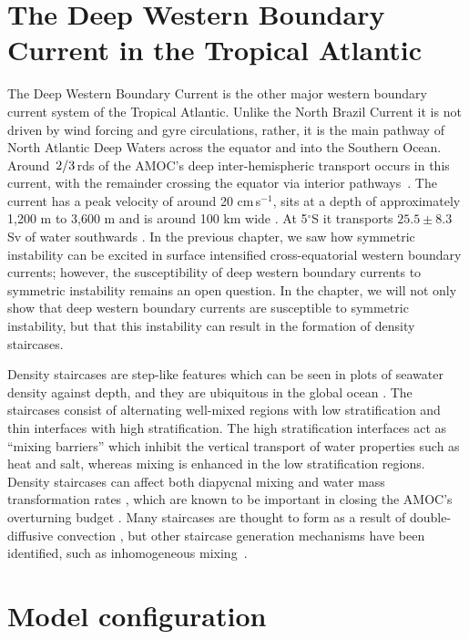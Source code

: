 \section{The Deep Western Boundary Current in the Tropical Atlantic}
\label{sec:DWBCIntro}
The Deep Western Boundary Current is the other major western boundary current system of the Tropical Atlantic. Unlike the North Brazil Current it is not driven by wind forcing and gyre circulations, rather, it is the main pathway of North Atlantic Deep Waters across the equator and into the Southern Ocean. Around $\flatfrac{2}{3}$rds of the AMOC's deep inter-hemispheric transport occurs in this current, with the remainder crossing the equator via interior pathways~\citep{Bower2019, Arhan1998}. The current has a peak velocity of around 20 cm\,s$^{-1}$, sits at a depth of approximately 1,200 m to 3,600 m and is around 100 km wide \citep{Rhein1995}. At 5$^\circ$S it transports $25.5\pm8.3$ Sv of water southwards \citep{Schott2005}. In the previous chapter, we saw how symmetric instability can be excited in surface intensified cross-equatorial western boundary currents; however, the susceptibility of deep western boundary currents to symmetric instability remains an open question. In the chapter, we will not only show that deep western boundary currents are susceptible to symmetric instability, but that this instability can result in the formation of density staircases.

Density staircases are step-like features which can be seen in plots of seawater density against depth, and they are ubiquitous in the global ocean \citep{Stern1960, Schmitt1987, Melling1984, Tait1968, Johannessen1974, Lambert1977}. The staircases consist of alternating well-mixed regions with low stratification and thin interfaces with high stratification. The high stratification interfaces act as ``mixing barriers'' which inhibit the vertical transport of water properties such as heat and salt, whereas mixing is enhanced in the low stratification regions. Density staircases can affect both diapycnal mixing and water mass transformation rates \citep{Schmitt2005}, which are known to be important in closing the AMOC's overturning budget \citep{DeLavergne2022}. Many staircases are thought to form as a result of double-diffusive convection \citep{Merryfield2000}, but other staircase generation mechanisms have been identified, such as inhomogeneous mixing~\citep{Balmforth1998}.



\section{Model configuration}
\label{sec:methods}

